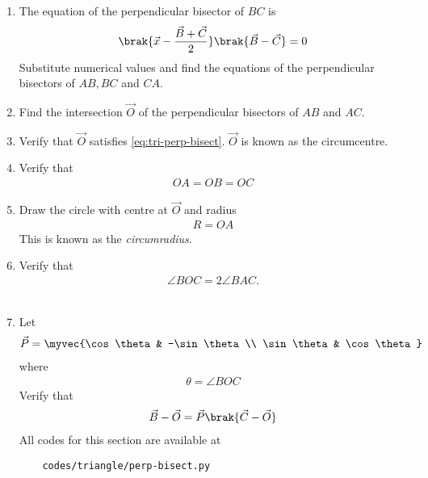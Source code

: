 \begin{enumerate}[label=\thesubsection.\arabic*.,ref=\thesubsection.\theenumi]

\item The equation of the perpendicular bisector of $BC$ is
		\begin{align}
			\label{eq:tri-perp-bisect}
			\brak{\vec{x}-\frac{\vec{B}+\vec{C}}{2}}\brak{\vec{B}-\vec{C}} = 0
		\end{align}
		Substitute numerical values and find the equations of the perpendicular bisectors of $AB, BC$ and $CA$.
	\\	
	\item Find the intersection $\vec{O}$ of the perpendicular bisectors of $AB$ and $AC$.
 \\
 
	\item Verify that $\vec{O}$ satisfies
			\eqref{eq:tri-perp-bisect}.
$\vec{O}$ is known as the circumcentre.\\
   
		\item Verify that 
		\begin{align}
			OA = OB = OC 
		\end{align}
	\item Draw the circle with centre at $\vec{O}$ and radius 
		\begin{align}
			R = OA
		\end{align}
		This is known as the {\em circumradius}. 
  \\  
	\item Verify that 
		\begin{align}
			\angle BOC = 2\angle BAC.
		\end{align}\\
  
	\item Let 
		\begin{align}
			\vec{P} = \myvec{\cos \theta & -\sin \theta \\ \sin \theta & \cos \theta}
		\end{align}
			where
\begin{align}
	\theta = \angle BOC
\end{align}
Verify that 
		\begin{align}
			\vec{B}-\vec{O}=\vec{P}\brak{\vec{C}-\vec{O}}
		\end{align}
All codes for this section are available at
\begin{lstlisting}
	codes/triangle/perp-bisect.py
\end{lstlisting}
\end{enumerate}
